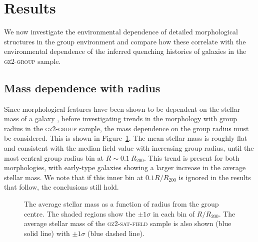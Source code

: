 \documentclass[useAMS,usenatbib]{mn2e}
\begin{document}
\section{Results}\label{sec:results}

We now investigate the environmental dependence of detailed morphological structures in the group environment and compare how these correlate with the environmental dependence of the inferred quenching histories of galaxies in the \textsc{gz2-group} sample. 

\subsection{Mass dependence with radius}

Since morphological features have been shown to be dependent on the stellar mass of a galaxy \citep[e.g. the increase in the bar fraction with stellar mass; see][]{nair10, skibba12}, before investigating trends in the morphology with group radius in the \textsc{gz2-group} sample, the mass dependence on the group radius must be considered. This is shown in Figure~\ref{fig:massdep}. The mean stellar mass is roughly flat and consistent with the median field value with increasing group radius, until the most central group radius bin at $R \sim 0.1~R_{200}$. This trend is present for both morphologies, with early-type galaxies showing a larger increase in the average stellar mass. We note that if this inner bin at $0.1 R/R_{200}$ is ignored in the results that follow, the conclusions still hold. 

\begin{figure}
\caption[Average mass with group radius in the \textsc{gz2-group} sample]{The average stellar mass as a function of radius from the group centre. The shaded regions show the $\pm1\sigma$ in each bin of $R/R_{200}$. The average stellar mass of the \textsc{gz2-sat-field} sample is also shown (blue solid line) with $\pm1\sigma$ (blue dashed line).}
\label{fig:massdep}
\end{figure}
\end{document}
